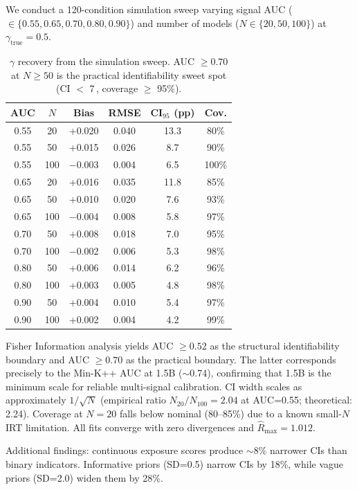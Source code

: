 \documentclass[11pt,a4paper]{article}
\newcommand{\pp}{\,\text{pp}}
\begin{document}
We conduct a 120-condition simulation sweep varying signal AUC ($\in \{0.55, 0.65, 0.70, 0.80, 0.90\}$) and number of models ($N \in \{20, 50, 100\}$) at $\gamma_{\text{true}} = 0.5$.

\begin{table}[t]
\centering
\small
\caption{$\gamma$ recovery from the simulation sweep. AUC $\geq 0.70$ at $N \geq 50$ is the practical identifiability sweet spot (CI $<$ 7\pp{}, coverage $\geq$ 95\%).}
\label{tab:identifiability}
\begin{tabular}{cccccc}
\toprule
\textbf{AUC} & $N$ & \textbf{Bias} & \textbf{RMSE} & \textbf{CI$_{95}$ (pp)} & \textbf{Cov.} \\
\midrule
0.55 & 20  & +0.020 & 0.040 & 13.3 & 80\% \\
0.55 & 50  & +0.015 & 0.026 & 8.7  & 90\% \\
0.55 & 100 & $-$0.003 & 0.004 & 6.5 & 100\% \\
\midrule
0.65 & 20  & +0.016 & 0.035 & 11.8 & 85\% \\
0.65 & 50  & +0.010 & 0.020 & 7.6  & 93\% \\
0.65 & 100 & $-$0.004 & 0.008 & 5.8 & 97\% \\
\midrule
0.70 & 50  & +0.008 & 0.018 & 7.0  & 95\% \\
0.70 & 100 & $-$0.002 & 0.006 & 5.3 & 98\% \\
\midrule
0.80 & 50  & +0.006 & 0.014 & 6.2  & 96\% \\
0.80 & 100 & +0.003 & 0.005 & 4.8  & 98\% \\
\midrule
0.90 & 50  & +0.004 & 0.010 & 5.4  & 97\% \\
0.90 & 100 & +0.002 & 0.004 & 4.2  & 99\% \\
\bottomrule
\end{tabular}
\end{table}

Fisher Information analysis yields AUC $\geq 0.52$ as the structural identifiability boundary and AUC $\geq 0.70$ as the practical boundary.
The latter corresponds precisely to the Min-K++ AUC at 1.5B ($\sim$0.74), confirming that 1.5B is the minimum scale for reliable multi-signal calibration.
CI width scales as approximately $1/\sqrt{N}$ (empirical ratio $N_{20}/N_{100} = 2.04$ at AUC=0.55; theoretical: 2.24).
Coverage at $N=20$ falls below nominal (80--85\%) due to a known small-$N$ IRT limitation.
All fits converge with zero divergences and $\hat{R}_{\max} = 1.012$.

Additional findings: continuous exposure scores produce $\sim$8\% narrower CIs than binary indicators.
Informative priors (SD=0.5) narrow CIs by 18\%, while vague priors (SD=2.0) widen them by 28\%.
\end{document}
